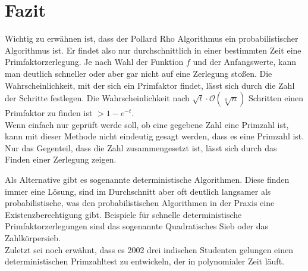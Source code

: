 
	\section{Fazit}
	\label{conclusion}
	Wichtig zu erw\"ahnen ist, dass der Pollard Rho Algorithmus ein probabilistischer Algorithmus ist. Er findet also nur durchschnittlich in einer bestimmten Zeit eine Primfaktorzerlegung. Je nach Wahl der Funktion $f$ und der Anfangswerte, kann man deutlich schneller oder aber gar nicht auf eine Zerlegung stoßen. Die Wahrscheinlichkeit, mit der sich ein Primfaktor findet, l\"asst sich durch die Zahl der Schritte festlegen. Die Wahrscheinlichkeit nach $\sqrt{t}\cdot \mathcal O (\sqrt[4]{n})$ Schritten einen Primfaktor zu finden ist $>1-e^{-t}$.\\
	Wenn einfach nur gepr\"uft werde soll, ob eine gegebene Zahl eine Primzahl ist, kann mit dieser Methode nicht eindeutig gesagt werden, dass es eine Primzahl ist. Nur das Gegenteil, dass die Zahl zusammengesetzt ist, l\"asst sich durch das Finden einer Zerlegung zeigen.
	
	\noindent Als Alternative gibt es sogenannte deterministische Algorithmen. Diese finden immer eine L\"osung, sind im Durchschnitt aber oft deutlich langsamer als probabilistische, was den probabilistischen Algorithmen in der Praxis eine Existenzberechtigung gibt. Beispiele f\"ur schnelle deterministische Primfaktorzerlegungen sind das sogenannte Quadratisches Sieb oder das Zahlk\"orpersieb.\\
	
	\noindent Zuletzt sei noch erw\"ahnt, dass es 2002 drei indischen Studenten gelungen einen deterministischen Primzahltest zu entwickeln, der in polynomialer Zeit l\"auft. 